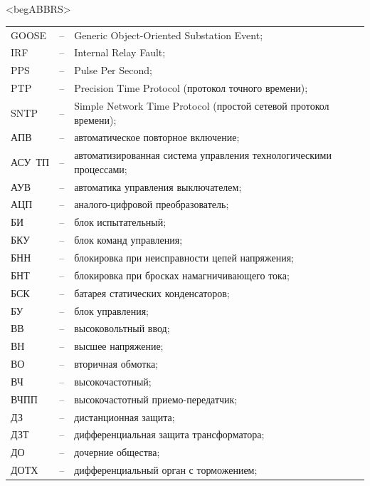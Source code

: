 \color{unimain}\section*{}
{\color{white}\fontsize{0.1pt}{0.1pt}\selectfont<begABBRS>}
\color{black}
\begin{longtable}{>{\raggedright\arraybackslash}m{2cm}>{\raggedright\arraybackslash}m{0.5cm}>{\raggedright\arraybackslash}m{20cm}}
\endfirsthead\endhead\endfoot\endlastfoot
GOOSE & -- & Generic Object-Oriented Substation Event; \\
IRF & -- & Internal Relay Fault; \\
PPS & -- & Pulse Per Second; \\
PTP & -- & Precision Time Protocol (протокол точного времени); \\
SNTP & -- & Simple Network Time Protocol (простой сетевой протокол времени); \\
АПВ & -- & автоматическое повторное включение; \\
АСУ~ТП & -- & автоматизированная система управления технологическими процессами; \\
АУВ & -- & автоматика управления выключателем; \\
АЦП & -- & аналого-цифровой преобразователь; \\
БИ & -- & блок испытательный; \\
БКУ & -- & блок команд управления; \\
БНН & -- & блокировка при неисправности цепей напряжения; \\
БНТ & -- & блокировка при бросках намагничивающего тока; \\
БСК & -- & батарея статических конденсаторов; \\
БУ & -- & блок управления; \\
ВВ & -- & высоковольтный ввод; \\
ВН & -- & высшее напряжение; \\
ВО & -- & вторичная обмотка; \\
ВЧ & -- & высокочастотный; \\
ВЧПП & -- & высокочастотный приемо-передатчик; \\
ДЗ & -- & дистанционная защита; \\
ДЗТ & -- & дифференциальная защита трансформатора; \\
ДО & -- & дочерние общества; \\
ДОТХ & -- & дифференциальный орган с торможением; \\

\end{longtable}
